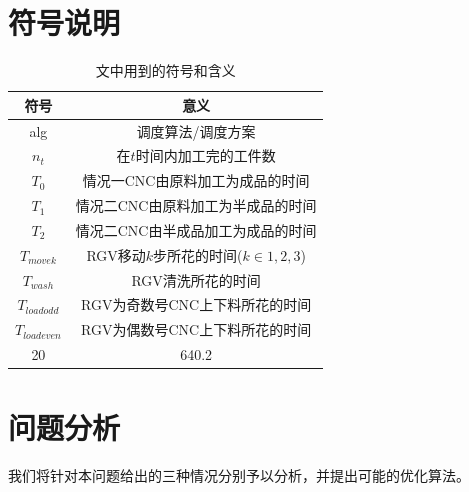 \documentclass{cumcmthesis}
\begin{document}
	\section{符号说明}
	\begin{table}[!htbp]
		\centering
		\begin{tabular}{cc}
		\toprule[1.5pt]
		符号 & 意义\\
		\midrule[1pt]
		alg     & 调度算法/调度方案 \\
		$n_t$ & 在$t$时间内加工完的工件数  \\
		$T_0$ & 情况一CNC由原料加工为成品的时间 \\
		$T_1$ & 情况二CNC由原料加工为半成品的时间 \\
		$T_2$ & 情况二CNC由半成品加工为成品的时间 \\
		$T_{move k}$ & RGV移动$k$步所花的时间($k\in{1, 2, 3}$) \\
		$T_{wash}$ & RGV清洗所花的时间 \\
		$T_{load odd}$ & RGV为奇数号CNC上下料所花的时间 \\
		$T_{load even}$ & RGV为偶数号CNC上下料所花的时间 \\
		20 & 640.2 \\
		\bottomrule[1.5pt]
		\end{tabular}
		\caption{文中用到的符号和含义}\label{fuHaoShuoMing}
	\end{table}
	
	\section{问题分析}
	我们将针对本问题给出的三种情况分别予以分析，并提出可能的优化算法。
\end{document}
